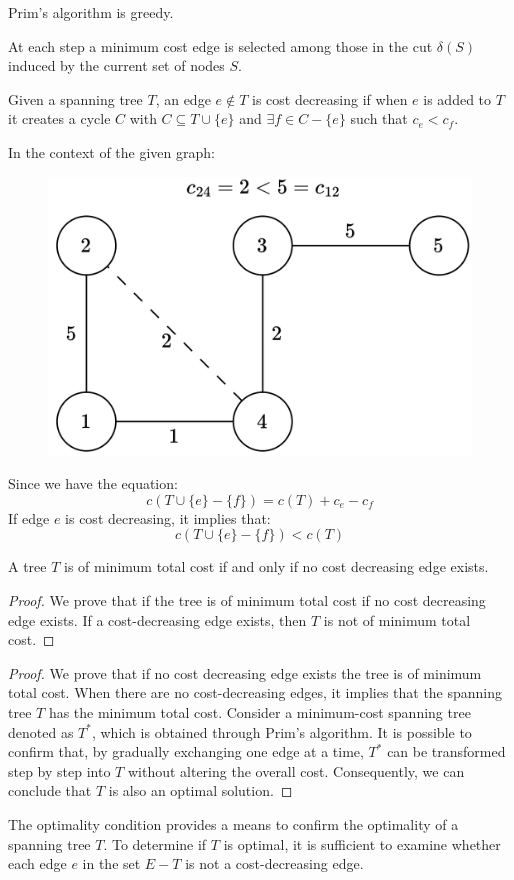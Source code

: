 \begin{proposition}
    Prim's algorithm is greedy. 
\end{proposition}     
At each step a minimum cost edge is selected among those in the cut $\delta (S)$ induced by the current set of nodes $S$. 
\begin{definition}
    Given a spanning tree $T$, an edge $e \notin T$ is cost decreasing if when $e$ is added to $T$ it creates a cycle $C$ with $C \subseteq T \cup \{e\}$ and $\exists f \in C-\{e\}$ such that $c_e<c_f$. 
\end{definition}
\begin{example}
    In the context of the given graph:
    \begin{figure}[H]
        \centering
        \includegraphics[width=0.4\linewidth]{images/costdecreasing.png}
    \end{figure}
    Since we have the equation:
    \[c(T \cup \{e\}-\{f\})=c(T)+c_e-c_f\]
    If edge $e$ is cost decreasing, it implies that:
    \[c(T \cup \{e\}-\{f\})<c(T)\]
\end{example}
\begin{theorem}
    A tree $T$ is of minimum total cost if and only if no cost decreasing edge exists. 
\end{theorem}

\begin{proof}
    We prove that if the tree is of minimum total cost if no cost decreasing edge exists.
    If a cost-decreasing edge exists, then $T$ is not of minimum total cost.
\end{proof}
\begin{proof}
    We prove that if no cost decreasing edge exists the tree is of minimum total cost.
    When there are no cost-decreasing edges, it implies that the spanning tree $T$ has the minimum total cost.
    Consider a minimum-cost spanning tree denoted as $T^{*}$, which is obtained through Prim's algorithm.
    It is possible to confirm that, by gradually exchanging one edge at a time, $T^{*}$ can be transformed step by step into $T$ without altering the overall cost.
    Consequently, we can conclude that $T$ is also an optimal solution.
\end{proof}
The optimality condition provides a means to confirm the optimality of a spanning tree $T$. 
To determine if $T$ is optimal, it is sufficient to examine whether each edge $e$ in the set $E-T$ is not a cost-decreasing edge.